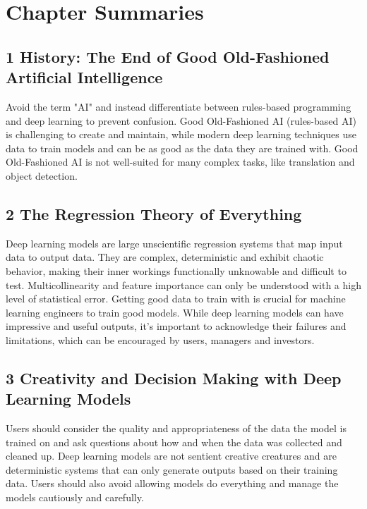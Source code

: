 \chapter*{Chapter Summaries}

\section*{1 History: The End of Good Old-Fashioned Artificial Intelligence}

Avoid the term "AI" and instead differentiate between rules-based programming and deep learning to prevent confusion. Good Old-Fashioned AI (rules-based AI) is challenging to create and maintain, while modern deep learning techniques use data to train models and can be as good as the data they are trained with. Good Old-Fashioned AI is not well-suited for many complex tasks, like translation and object detection.

\section*{2 The Regression Theory of Everything}

Deep learning models are large unscientific regression systems that map input data to output data. They are complex, deterministic and exhibit chaotic behavior, making their inner workings functionally unknowable and difficult to test. Multicollinearity and feature importance can only be understood with a high level of statistical error. Getting good data to train with is crucial for machine learning engineers to train good models. While deep learning models can have impressive and useful outputs, it's important to acknowledge their failures and limitations, which can be encouraged by users, managers and investors.

\section*{3 Creativity and Decision Making with Deep Learning Models}

Users should consider the quality and appropriateness of the data the model is trained on and ask questions about how and when the data was collected and cleaned up. Deep learning models are not sentient creative creatures and are deterministic systems that can only generate outputs based on their training data. Users should also avoid allowing models do everything and manage the models cautiously and carefully.

